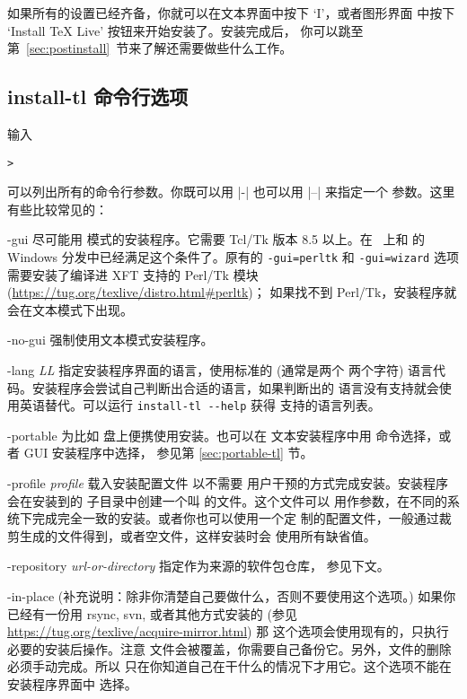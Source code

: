 \documentclass{article}
\begin{document}
如果所有的设置已经齐备，你就可以在文本界面中按下 `I'，或者图形界面
中按下 `Install TeX Live' 按钮来开始安装了。安装完成后，
你可以跳至第~\ref{sec:postinstall}~节来了解还需要做些什么工作。

\subsection{install-tl 命令行选项}
\label{sec:cmdline}

输入
\begin{alltt}
> 
\end{alltt}
可以列出所有的命令行参数。你既可以用 |-| 也可以用 |--| 来指定一个
参数。这里有些比较常见的：

\begin{ttdescription}
\item[-gui] 尽可能用 \GUI{} 模式的安装程序。它需要 Tcl/Tk 版本 8.5 以上。在
  \MacOSX\ 上和 \TL{} 的 Windows 分发中已经满足这个条件了。原有的
  \texttt{-gui=perltk} 和 \texttt{-gui=wizard} 选项需要安装了编译进 XFT 支持的
  Perl/Tk 模块 (\url{https://tug.org/texlive/distro.html#perltk})；
  如果找不到 Perl/Tk，安装程序就会在文本模式下出现。

\item[-no-gui] 强制使用文本模式安装程序。

\item[-lang {\sl LL}] 指定安装程序界面的语言，使用标准的 (通常是两个
两个字符) 语言代码。安装程序会尝试自己判断出合适的语言，如果判断出的
语言没有支持就会使用英语替代。可以运行 \verb|install-tl --help| 获得
支持的语言列表。

\item[-portable] 为比如 \USB{} 盘上便携使用安装。也可以在
文本安装程序中用  命令选择，或者 GUI 安装程序中选择，
参见第 \ref{sec:portable-tl} 节。

\item[-profile {\sl profile}] 载入安装配置文件  以不需要
用户干预的方式完成安装。安装程序会在安装到的 
子目录中创建一个叫  的文件。这个文件可以
用作参数，在不同的系统下完成完全一致的安装。或者你也可以使用一个定
制的配置文件，一般通过裁剪生成的文件得到，或者空文件，这样安装时会
使用所有缺省值。

\item [-repository {\sl url-or-directory}] 指定作为来源的软件包仓库，
参见下文。

\item[-in-place] (补充说明：除非你清楚自己要做什么，否则不要使用这个选项。)
如果你已经有一份用 rsync, svn, 或者其他方式安装的
\TL{} (参见 \url{https://tug.org/texlive/acquire-mirror.html}) 那
这个选项会使用现有的，只执行必要的安装后操作。注意 
文件会被覆盖，你需要自己备份它。另外，文件的删除必须手动完成。所以
只在你知道自己在干什么的情况下才用它。这个选项不能在安装程序界面中
选择。

\end{ttdescription}
\end{document}
